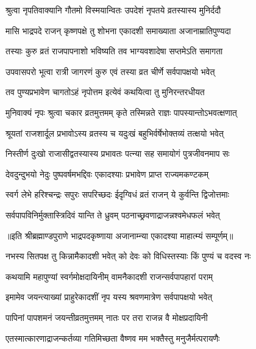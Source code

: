\twolineshloka
{श्रुत्वा नृपतिवाक्यानि गौतमो विस्मयान्वितः}
{उपदेशं नृपतये व्रतस्यास्य मुनिर्ददौ} %

\twolineshloka
{मासि भाद्रपदे राजन् कृष्णपक्षे तु शोभना}
{एकादशी समाख्याता अजानाम्रातिपुण्यदा} %

\twolineshloka
{तस्याः कुरु व्रतं राजपापनाशो भविष्यति}
{तव भाग्यवशादेषा सप्तमेऽति समागता} %

\twolineshloka
{उपवासपरो भूत्वा रात्री जागरणं कुरु}
{एवं तस्या व्रत चीर्णे सर्वपापक्षयो भवेत्} %

\twolineshloka
{तव पुण्यप्रभावेण चागतोऽहं नृपोत्तम}
{इत्येवं कथयित्वा तु मुनिरन्तरधीयत} %

\twolineshloka
{मुनिवाक्यं नृपः श्रुत्वा चकार व्रतमुत्तमम्}
{कृते तस्मिन्नते राज्ञः पापस्यान्तोऽभवत्क्षणात्} %

\twolineshloka
{श्रूयतां राजशार्दूल प्रभावोऽस्य व्रतस्य च}
{यदुःखं बहुभिर्वर्षेभोक्तव्यं तत्क्षयो भवेत्} %

\twolineshloka
{निस्तीर्ण दुःखो राजासीद्वतस्यास्य प्रभावतः}
{पत्न्या सह समायोगं पुत्रजीवनमाप सः} %

\twolineshloka
{देवदुन्दुभयो नेदुः पुष्पवर्षमभद्दिवः}
{एकादश्याः प्रभावेण प्राप्त राज्यमकण्टकम्} %

\twolineshloka
{स्वर्ग लेभे हरिश्चन्द्रः सपुरः सपरिच्छदः}
{ईदृग्विधं व्रतं राजन् ये कुर्वन्ति द्विजोत्तमाः} %

\twolineshloka
{सर्वपापविनिर्मुक्तास्त्रिदिवं यान्ति ते ध्रुवम्}
{पठनाच्छ्रवणाद्राजन्नश्वमेधफलं भवेत्} %

॥इति श्रीब्रह्माण्डपुराणे भाद्रपदकृष्णाया अजानाम्न्या एकादश्या माहात्म्यं सम्पूर्णम्॥



\twolineshloka
{नभस्य सितपक्ष तु किन्नामैकादशी भवेत्}
{को देवः को विधिस्तस्याः किं पुण्यं च वदस्व नः} %


\twolineshloka
{कथयामि महापुण्यां स्वर्गमोक्षदायिनीम्}
{वामनैकादशी राजन्सर्वपापहारां पराम्} %

\twolineshloka
{इमामेव जयन्त्याख्यां प्राहुरेकादशीं नृप}
{यस्य श्रवणमात्रेण सर्वपापक्षयो भवेत्} %

\twolineshloka
{पापिनां पापशमनं जयन्तीव्रतमुत्तमम्}
{नातः पर तरा राजन्न वै मोक्षप्रदायिनी} %

\twolineshloka
{एतस्मात्कारणाद्राजन्कर्तव्या गतिमिच्छता}
{वैष्णव मम भक्तैस्तु मनुजैर्मत्परायणैः} %

